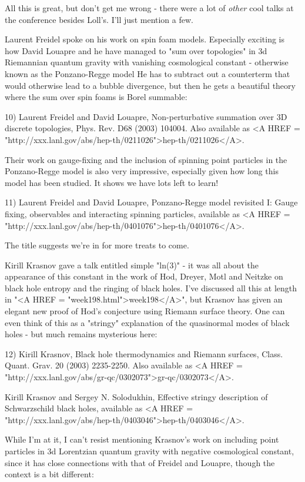 All this is great, but don't get me wrong - there were a lot of \emph{other}
cool talks at the conference besides Loll's.  I'll just mention a few.

Laurent Freidel spoke on his work on spin foam models.  Especially
exciting is how David Louapre and he have managed to "sum over 
topologies" in 3d Riemannian quantum gravity with vanishing cosmological
constant - otherwise known as the Ponzano-Regge model  He has to subtract 
out a counterterm that would otherwise lead to a bubble divergence, but 
then he gets a beautiful theory where the sum over spin foams is Borel 
summable:

10) Laurent Freidel and David Louapre, Non-perturbative summation over 
3D discrete topologies, Phys. Rev. D68 (2003) 104004.  Also available as
<A HREF = "http://xxx.lanl.gov/abs/hep-th/0211026">hep-th/0211026</A>.

Their work on gauge-fixing and the inclusion of spinning point particles
in the Ponzano-Regge model is also very impressive, especially given how
long this model has been studied.  It shows we have lots left to learn! 

11) Laurent Freidel and David Louapre, Ponzano-Regge model revisited I: 
Gauge fixing, observables and interacting spinning particles, available
as <A HREF = "http://xxx.lanl.gov/abs/hep-th/0401076">hep-th/0401076</A>.

The title suggests we're in for more treats to come.

Kirill Krasnov gave a talk entitled simple "ln(3)" - it was all about
the appearance of this constant in the work of Hod, Dreyer, Motl and 
Neitzke on black hole entropy and the ringing of black holes.  I've
discussed all this at length 
in "<A HREF = "week198.html">week198</A>", but Krasnov has given 
an elegant
new proof of Hod's conjecture using Riemann surface theory.  One can 
even think of this as a "stringy" explanation of the quasinormal 
modes of black holes - but much remains mysterious here:

12) Kirill Krasnov, Black hole thermodynamics and Riemann surfaces,
Class. Quant. Grav. 20 (2003) 2235-2250.  Also available 
as <A HREF = "http://xxx.lanl.gov/abs/gr-qc/0302073">gr-qc/0302073</A>.

Kirill Krasnov and Sergey N. Solodukhin, Effective stringy description 
of Schwarzschild black holes, available 
as <A HREF = "http://xxx.lanl.gov/abs/hep-th/0403046">hep-th/0403046</A>.

While I'm at it, I can't resist mentioning Krasnov's work on including
point particles in 3d Lorentzian quantum gravity with negative
cosmological constant, since it has close connections with that of 
Freidel and Louapre, though the context is a bit different:

